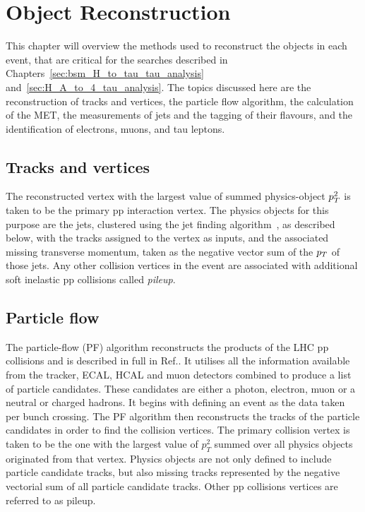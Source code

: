 \chapter{Object Reconstruction}
\label{sec:object_reconstruction}

This chapter will overview the methods used to reconstruct the objects in each event, that are critical for the searches described in Chapters~\ref{sec:bsm_H_to_tau_tau_analysis} and~\ref{sec:H_A_to_4_tau_analysis}.
The topics discussed here are the reconstruction of tracks and vertices, the particle flow algorithm, the calculation of the \ac{MET}, the measurements of jets and the tagging of their flavours, and the identification of electrons, muons, and tau leptons.

\section{Tracks and vertices}

The reconstructed vertex with the largest value of summed physics-object $p_{T}^{2}$ is taken to be the primary pp interaction vertex. 
The physics objects for this purpose are the jets, clustered using the jet finding algorithm~\cite{Cacciari:2008gp,Cacciari:2011ma}, as described below, with the tracks assigned to the vertex as inputs, and the
associated missing transverse momentum, taken as the negative vector sum of the $p_{T}$ of those jets.
Any other collision vertices in the event are associated with additional soft inelastic pp collisions called \emph{pileup}.

\section{Particle flow}

The particle-flow (PF) algorithm reconstructs the products of the LHC pp collisions and is described in full in Ref.\cite{PF_CMS}.  
It utilises all the information available from the tracker, ECAL, HCAL and muon detectors combined to produce a list of particle candidates. 
These candidates are either a photon, electron, muon or a neutral or charged hadrons. It begins with defining an event as the data taken per bunch crossing. 
The PF algorithm then reconstructs the tracks of the particle candidates in order to find the collision vertices. 
The primary collision vertex is taken to be the one with the largest value of \(p_T^{2}\) summed over all physics objects originated from that vertex. 
Physics objects are not only defined to include particle candidate tracks, but also missing tracks represented by the negative vectorial sum of all particle candidate tracks. Other pp collisions vertices are referred to as pileup. \\

